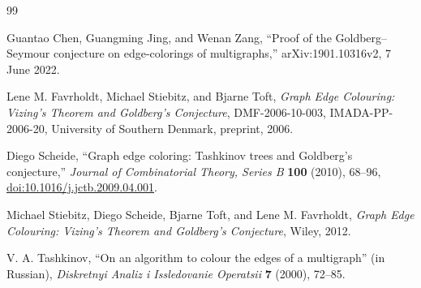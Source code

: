 \documentclass[11pt]{article}
\theoremstyle{definition}
\begin{document}
\begin{thebibliography}{99}

Guantao Chen, Guangming Jing, and Wenan Zang,
``Proof of the Goldberg--Seymour conjecture on edge-colorings of
multigraphs,''
arXiv:1901.10316v2, 7 June 2022.

Lene M. Favrholdt, Michael Stiebitz, and Bjarne Toft,
\emph{Graph Edge Colouring: Vizing's Theorem and Goldberg's Conjecture},
DMF-2006-10-003, IMADA-PP-2006-20, University of Southern Denmark,
preprint, 2006.

Diego Scheide,
``Graph edge coloring: Tashkinov trees and Goldberg's conjecture,''
\emph{Journal of Combinatorial Theory, Series B} \textbf{100} (2010),
68--96,
\href{https://doi.org/10.1016/j.jctb.2009.04.001}
     {doi:10.1016/j.jctb.2009.04.001}.

Michael Stiebitz, Diego Scheide, Bjarne Toft, and Lene M. Favrholdt,
\emph{Graph Edge Colouring: Vizing's Theorem and Goldberg's Conjecture},
Wiley, 2012.

V. A. Tashkinov,
``On an algorithm to colour the edges of a multigraph'' (in Russian),
\emph{Diskretnyi Analiz i Issledovanie Operatsii} \textbf{7} (2000),
72--85.

\end{thebibliography}
\end{document}
